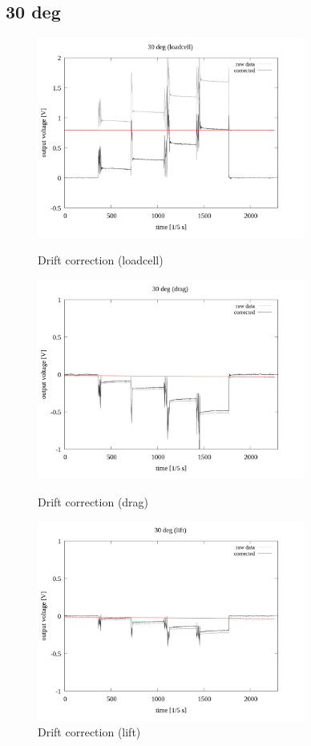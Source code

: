 \documentclass[twocolumn,a4j]{jsarticle}
\begin{document}
\newpage
\subsection{30 deg}
\begin{figure}[htbp]
    \footnotesize
    \begin{center}
        \includegraphics[width=88mm]{../images/drift/30_loadcell_drift.png}
        \caption{Drift correction (loadcell)}
        \includegraphics[width=88mm]{../images/drift/30_drag_drift.png}
        \caption{Drift correction (drag)}
        \includegraphics[width=88mm]{../images/drift/30_lift_drift.png}
        \caption{Drift correction (lift)}
    \end{center}
\end{figure}
\end{document}
